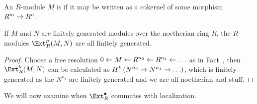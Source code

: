 \documentclass[a4paper,parskip=half,numbers=enddot, DIV=12]{scrreprt}
\begin{document}
\begin{defi}
	An $R$-module $M$ is  if it may be written as a cokernel of some morphism $R^m\morphism R^n$.
\end{defi}
\begin{fact}
	If $M$ and $N$ are finitely generated modules over the noetherian ring $R$, the $R$-modules $\Ext_R^p(M,N)$ are all finitely generated.
\end{fact}
\begin{proof}
	Choose a free resolution $0\lmorphism M\lmorphism R^{n_0}\lmorphism R^{n_1}\lmorphism\ldots$ as in Fact~, then $\Ext_R^k(M,N)$ can be calculated as $H^k\left(N^{n_0}\morphism N^{n_1}\morphism\ldots\right)$, which is finitely generated as the $N^{n_i}$ are finitely generated and we are all noetherian and stuff.
\end{proof}
We will now examine when $\Ext_R^\bullet$ commutes with localization.
\end{document}
